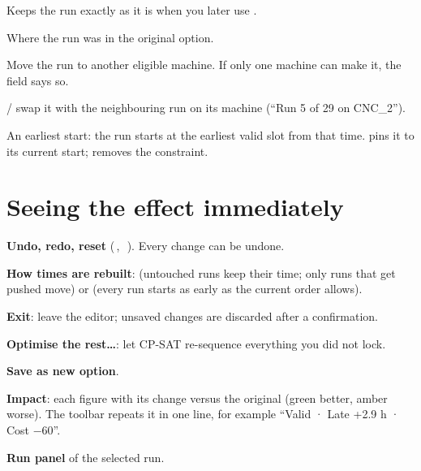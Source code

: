 \begin{description}[style=nextline, leftmargin=1.2em, font=\bfseries\color{brand}]
  \item[Lock this run (L)] Keeps the run exactly as it is when you later use .
  \item[Original] Where the run was in the original option.
  \item[Machine] Move the run to another eligible machine. If only one machine can make it, the field says so.
  \item[Order on the machine]  /  swap it with the neighbouring run on its machine
        (``Run 5 of 29 on CNC\_2'').
  \item[Not before] An earliest start: the run starts at the earliest valid slot from that time.  pins it to its current start;  removes the constraint.
\end{description}

\section{Seeing the effect immediately}


\begin{callouts}
  \item[1] \textbf{Undo, redo, reset} (\,, \,\,). Every change can be
           undone.
  \item[2] \textbf{How times are rebuilt}:  (untouched runs keep their time; only runs that
           get pushed move) or  (every run starts as early as the current order allows).
  \item[3] \textbf{Exit}: leave the editor; unsaved changes are discarded after a confirmation.
  \item[4] \textbf{Optimise the rest\dots}: let CP-SAT re-sequence everything you did not lock.
  \item[5] \textbf{Save as new option}.
  \item[6] \textbf{Impact}: each figure with its change versus the original (green better, amber worse). The
           toolbar repeats it in one line, for example ``Valid · Late +2.9 h · Cost −60''.
  \item[7] \textbf{Run panel} of the selected run.
\end{callouts}

